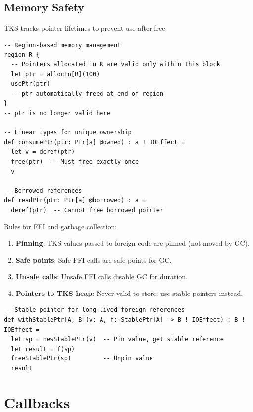 \subsection{Memory Safety}
\label{subsec:memory-safety}

\begin{definition}
\label{def:pointer-lifetime}
TKS tracks pointer lifetimes to prevent use-after-free:
\begin{verbatim}
-- Region-based memory management
region R {
  -- Pointers allocated in R are valid only within this block
  let ptr = allocIn[R](100)
  usePtr(ptr)
  -- ptr automatically freed at end of region
}
-- ptr is no longer valid here

-- Linear types for unique ownership
def consumePtr(ptr: Ptr[a] @owned) : a ! IOEffect =
  let v = deref(ptr)
  free(ptr)  -- Must free exactly once
  v

-- Borrowed references
def readPtr(ptr: Ptr[a] @borrowed) : a =
  deref(ptr)  -- Cannot free borrowed pointer
\end{verbatim}
\end{definition}

\begin{definition}[GC Interaction]
\label{def:gc-interaction}
Rules for FFI and garbage collection:
\begin{enumerate}
  \item \textbf{Pinning}: TKS values passed to foreign code are pinned (not moved by GC).
  \item \textbf{Safe points}: Safe FFI calls are safe points for GC.
  \item \textbf{Unsafe calls}: Unsafe FFI calls disable GC for duration.
  \item \textbf{Pointers to TKS heap}: Never valid to store; use stable pointers instead.
\end{enumerate}
\begin{verbatim}
-- Stable pointer for long-lived foreign references
def withStablePtr[A, B](v: A, f: StablePtr[A] -> B ! IOEffect) : B ! IOEffect =
  let sp = newStablePtr(v)  -- Pin value, get stable reference
  let result = f(sp)
  freeStablePtr(sp)         -- Unpin value
  result
\end{verbatim}
\end{definition}

\section{Callbacks}
\label{sec:ffi-callbacks}

